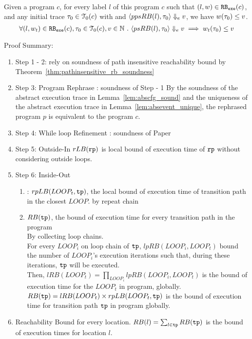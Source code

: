 \begin{thm}
  Given a program ${c}$, for every label $l$ of this program $c$ such that $(l, w) \in \mathtt{RB_{exe}}(c)$, 
  and any initial trace $\mathtt{\tau}_0 \in \mathcal{T}_0(c)$ with 
  and $\langle ppsRB(l), \mathtt{\tau}_0 \rangle \Downarrow_e v$,
  we have $ w(\mathtt{\tau}_0) \leq v $.
  \[
    \begin{array}{l}
    \forall (l, w_{t}) \in \mathtt{RB_{exe}}(c),
    \mathtt{\tau}_0 \in \mathcal{T}_0(c), 
    v \in \mathbb{N} ~.~
    \langle psRB(l), \mathtt{\tau}_0 \rangle \Downarrow_e v
    \implies
    w_{t}(\mathtt{\tau}_0) \leq v
    \end{array}
  \]
  \end{thm}
Proof Summary:
\begin{enumerate}
\item Step 1 - 2: rely on soundness of path insensitive reachability bound by Theorem~\ref{thm:pathinsensitive_rb_soundness}
\\
\item Step 3: Program Rephrase : soundness of Step - 1
By the soundness of the abstract execution trace in Lemma~\ref{lem:abscfg_sound}
and the uniqueness of the abstract execution trace in Lemma~\ref{lem:absevent_unique},
the rephrased program $p$ is equivalent to the program $c$.
\\
\item Step 4: While loop Refinement : soundness of Paper \cite{GulwaniJK09}
\\
\item Step 5: Outside-In 
$rLB(\mathtt{rp})$ is local bound of execution time of $\mathtt{rp}$ without considering outside loops.
\\
\item Step 6: Inside-Out
\begin{enumerate}
\item: $rpLB(LOOP_t, \mathtt{tp})$, the local bound of execution time of 
transition path in the closest $LOOP$.
by repeat chain 
\item $RB(\mathtt{tp})$, the bound of execution time for every transition path in the program
\\
By collecting loop chains.
\\
For every $LOOP_i$ on loop chain of $\mathtt{tp}$, $lpRB(LOOP_i, LOOP_t)$ bound 
the number of $LOOP_i$'s execution iterations
        such that, during these iterations, $\mathtt{tp}$ will be executed. 
\\
Then, $lRB(LOOP_t) = \prod\limits_{LOOP_i} lpRB(LOOP_i, LOOP_t)$ is the bound of execution time for the $LOOP_t$ in program, globally.
\\
$RB(\mathtt{tp}) = lRB(LOOP_t) \times rpLB(LOOP_t, \mathtt{tp}) $ is the bound of execution time for transition path $\mathtt{tp}$ 
in program globally.
\end{enumerate}
\item Reachability Bound for every location.
$RB(l) = \sum_{l \in \mathtt{tp}}RB(\mathtt{tp})$ is the bound of execution times for location $l$.

\end{enumerate}
